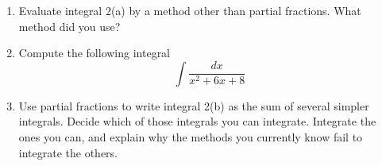 \documentclass[12pt]{article}
\begin{document}
\begin{enumerate}
\vspace{2.75in}
\item Evaluate integral 2(a) by a method other than partial fractions. What method did you use?

\newpage

\item Compute the following integral 
\[
\int \frac{dx}{x^2 + 6x + 8}
\]
\vfill

\item Use partial fractions to write integral 2(b) as the sum of several simpler integrals. Decide which of those integrals you can integrate. Integrate the ones you can, and explain why the methods you currently know fail to integrate the others.
\vfill
\vfill




\end{enumerate} 
\end{document}
